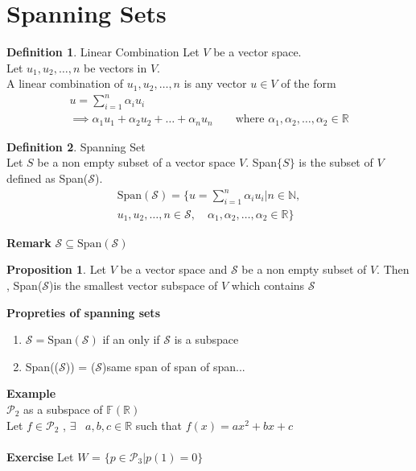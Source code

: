 \documentclass[
12pt,
]{article}
\newcommand{\ex}{\textbf{Example}}
\newcommand{\un}{u_1 , u_2 , \dots , n}
\newcommand{\an}{\alpha_1, \alpha_2, \dots, \alpha_2 }
\newcommand{\sS}{\text{Span}(\mathcal{S})}
\newcommand{\sSt}{($\mathcal{S}$)}
\theoremstyle{definition}
\theoremstyle{definition}
\theoremstyle{definition}
\newtheorem{Definition}{Definition}[section]
\theoremstyle{definition}
\newtheorem{Proposition}{Proposition}[section]
\begin{document}
\section{Spanning Sets}
\begin{Definition}{Linear Combination}
	Let $V$ be a vector space. \\
	Let $ \un $ be vectors in $V$. \\
	A linear combination of $\un $ is any vector $u\in V$ of the form \\
	\begin{gather*}
		 u = \sum_{i = 1}^{n} \alpha_i u_i \\
		 \implies \alpha_1 u_1 + \alpha_2 u_2 + \dots + \alpha_n u_n \qquad \text{where  } \an \in \mathbb{R}
	\end{gather*}
\end{Definition}
\begin{Definition}{Spanning Set}\\
	Let $S$ be a non empty subset of a vector space $V$. Span$\{S\}$ is the subset of $V$ defined as Span($\mathcal{S}$).
	\begin{gather*}
		\sS = \{u = \sum_{i=1}^{n} \alpha_i u_i | n \in \mathbb{N}, \\
		 \un \in \mathcal{S}, \quad  \an \in \mathbb{R} \}
	\end{gather*}
\end{Definition}
\textbf{Remark} $\mathcal{S} \subseteq \sS $
\begin{Proposition}
	Let $V$ be a vector space and $\mathcal{S}$ be a non empty subset of $V$. Then , Span\sSt is the smallest vector subspace of $V$ which contains $\mathcal{S}$
\end{Proposition} 
\textbf{Propreties of spanning sets}\\
\begin{enumerate}
	\item $ \mathcal{S} = \sS $ if an only if $\mathcal{S}$ is a subspace \\
	\item Span(\sSt) = \sSt        same span of span of span...
\end{enumerate}
\ex \\
 $\mathcal{P}_2 $ as a subspace of $\mathbb{F} (\mathbb{R})$ \\
Let $f \in \mathcal{P}_2 $ \quad , $\exists$ \ $a,b,c \in \mathbb{R}$ such that $f(x) = ax^2 +bx +c $ \\ \\
\textbf{Exercise}
Let $W$ = $\{p \in \mathcal{P}_3 | p(1) = 0\}$\\
\end{document}

